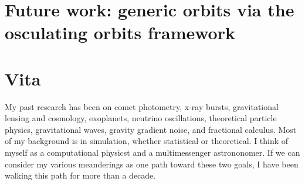 \documentclass[12pt,letterpaper]{lsuetd}
\begin{document}
\chapter{Future work: generic orbits via the osculating orbits framework}
\doublespacing

\label{futurework}
\pagebreak
\singlespacing
\begin{thebibliography}{999}
\vspace{0.9em}

\end{thebibliography}
%
%

\chapter*{Vita}
\doublespacing
\setlength{\parindent}{1.75em}
\vspace{0.2em}
My past research has been on comet photometry, x-ray bursts, gravitational lensing and cosmology, exoplanets, neutrino oscillations, theoretical particle physics, gravitational waves, gravity gradient noise, and fractional calculus. Most of my background is in simulation, whether statistical or theoretical. I think of myself as a computational physicst and a multimessenger astrononomer. If we can consider my various meanderings as one path toward these two goals, I have been walking this path for more than a decade.
\end{document}

